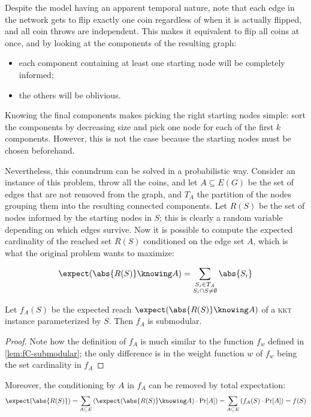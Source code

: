 Despite the model having an apparent temporal nature, note that each edge in the network gets to flip exactly one coin regardless of when it is actually flipped, and all coin throws are independent. This makes it equivalent to flip all coins at once, and by looking at the components of the resulting graph:
\begin{itemize}
    \item each component containing at least one starting node will be completely informed;
    \item the others will be oblivious.
\end{itemize}

Knowing the final components makes picking the right starting nodes simple: sort the components by decreasing size and pick one node for each of the first $k$ components. However, this is not the case because the starting nodes must be chosen beforehand.

Nevertheless, this conundrum can be solved in a probabilistic way. Consider an instance of this problem, throw all the coins, and let $A \subseteq E(G)$ be the set of edges that are not removed from the graph, and $T_A$ the partition of the nodes grouping them into the resulting connected components. Let $R(S)$ be the set of nodes informed by the starting nodes in $S$; this is clearly a random variable depending on which edges survive. Now it is possible to compute the expected cardinality of the reached set $R(S)$ conditioned on the edge set $A$, which is what the original problem wants to maximize:

\[
    \expect(\abs{R(S)} \knowing A) = \sum_{\substack{S_i \in T_A \\ S_i \cap S \neq \emptyset}} \abs{S_i}
\]

\begin{claim}
    Let $f_A(S)$ be the expected reach $\expect(\abs{R(S)} \knowing A)$ of a \textsc{kkt} instance parameterized by $S$. Then $f_A$ is submodular. 
\end{claim}

\begin{proof}
    Note how the definition of $f_A$ is much similar to the function $f_w$ defined in \ref{lem:fC-submodular}; the only difference is in the weight function $w$ of $f_w$ being the set cardinality in $f_A$
\end{proof}

Moreover, the conditioning by $A$ in $f_A$ can be removed by total expectation:
\begin{equation}\label{eq:sub-fs}
    \expect(\abs{R(S)}) = \sum_{A \subseteq E} \left( \expect(\abs{R(S)} \knowing A) \cdot \Pr[A] \right) = \sum_{A \subseteq E} \left( f_A(S) \cdot \Pr[A] \right) = f(S)
\end{equation}

